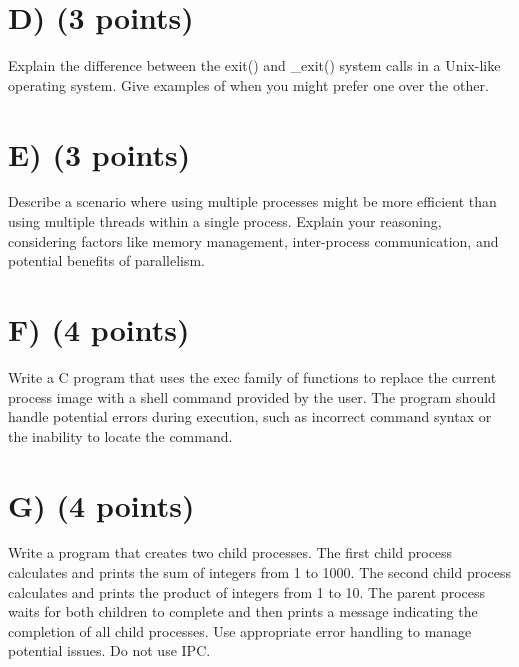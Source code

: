 \documentclass{article}
\begin{document}

\section*{D) (3 points)}
Explain the difference between the exit() and _exit() system calls in a Unix-like operating system.  Give examples of when you might prefer one over the other.


\section*{E) (3 points)}
Describe a scenario where using multiple processes might be more efficient than using multiple threads within a single process.  Explain your reasoning, considering factors like memory management, inter-process communication, and potential benefits of parallelism.



\section*{F) (4 points)}
Write a C program that uses the exec family of functions to replace the current process image with a shell command provided by the user.  The program should handle potential errors during execution, such as incorrect command syntax or the inability to locate the command.



\section*{G) (4 points)}
Write a program that creates two child processes. The first child process calculates and prints the sum of integers from 1 to 1000. The second child process calculates and prints the product of integers from 1 to 10. The parent process waits for both children to complete and then prints a message indicating the completion of all child processes. Use appropriate error handling to manage potential issues.  Do not use IPC.


\end{document}
